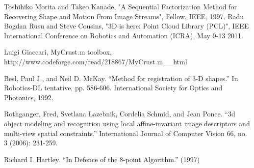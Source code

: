 \documentclass[11pt,twocolumn]{article}
\begin{document}
\begin{thebibliography}{9}

Toshihiko Morita and Takeo Kanade, "A Sequential Factorization Method for Recovering Shape and Motion From Image Streams", Fellow, IEEE, 1997.
Radu Bogdan Rusu and Steve Cousins, "3D is here: Point Cloud Library (PCL)", IEEE International Conference on Robotics and Automation (ICRA), May 9-13 2011.

Luigi Giaccari, MyCrust.m toolbox,
http://www.codeforge.com/read/218867/MyCrust.m__html

Besl, Paul J., and Neil D. McKay. ``Method for registration of 3-D shapes.'' In Robotics-DL tentative, pp. 586-606. International Society for Optics and Photonics, 1992.

Rothganger, Fred, Svetlana Lazebnik, Cordelia Schmid, and Jean Ponce. ``3d object modeling and recognition using local affine-invariant image descriptors and multi-view spatial constraints.'' International Journal of Computer Vision 66, no. 3 (2006): 231-259.

Richard I. Hartley. ``In Defence of the 8-point Algorithm.'' (1997)


\end{thebibliography}
\end{document}
